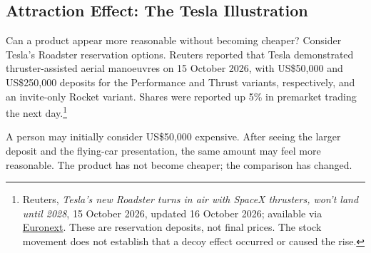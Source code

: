 \documentclass[12pt,oneside]{report}
\begin{document}
\subsection{Attraction Effect: The Tesla Illustration}

Can a product appear more reasonable without becoming cheaper?
Consider Tesla's Roadster reservation options. Reuters reported
that Tesla demonstrated thruster-assisted aerial manoeuvres on
15 October 2026, with US\$50,000 and US\$250,000 deposits for the
Performance and Thrust variants, respectively, and an invite-only
Rocket variant. Shares were reported up 5\% in premarket trading
the next day.\footnote{Reuters, \textit{Tesla's new Roadster turns in air
with SpaceX thrusters, won't land until 2028}, 15 October 2026,
updated 16 October 2026; available via
\href{https://live.euronext.com/en/financial-news/teslas-new-roadster-turns-air-spacex-thrusters-wont-land-until-2028}{Euronext}.
These are reservation deposits, not final prices. The stock movement
does not establish that a decoy effect occurred or caused the rise.}

A person may initially consider US\$50,000 expensive. After seeing
the larger deposit and the flying-car presentation, the same amount
may feel more reasonable. The product has not become cheaper;
the comparison has changed.
\end{document}
